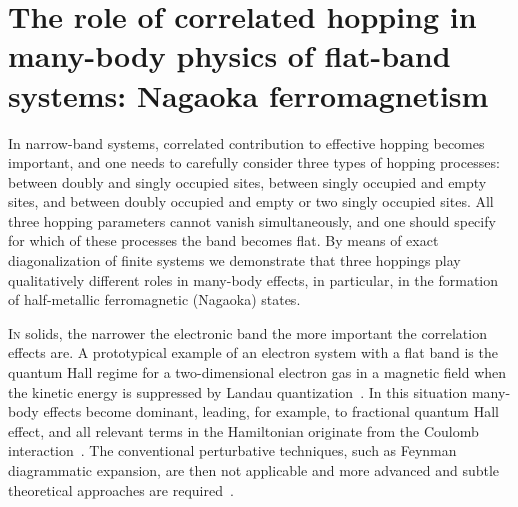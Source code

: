 \cleartoverso
\thispagestyle{empty}%
\BgThisPage
\clearpage
\chapter[The role of correlated hopping in many-body physics of flat-band systems: Nagaoka ferromagnetism][Correlated hoppings in many-body physics of flat-band systems]{The role of correlated hopping in many-body physics of flat-band systems: Nagaoka ferromagnetism}\label{ch:corr-hops}
\BgThisPage

{\small In narrow-band systems, correlated contribution to effective hopping becomes important, and one needs to carefully consider three types of hopping processes: between doubly and singly occupied sites, between singly occupied and empty sites, and between doubly occupied and empty or two singly occupied sites. All three hopping parameters cannot vanish simultaneously, and one should specify for which of these processes the band becomes flat. By means of exact diagonalization of finite systems we demonstrate that three hoppings play qualitatively different roles in many-body effects, in particular, in the formation of half-metallic ferromagnetic (Nagaoka) states.}

\clearpage


\lettrine[lines=3]{I}{n} solids, the narrower the electronic band the more important the correlation effects are. A prototypical example of an electron system with a flat band is the quantum Hall regime for a two-dimensional electron gas in a magnetic field when the kinetic energy is suppressed by Landau quantization~\cite{quant_hall}. In this situation many-body effects become dominant, leading, for example, to fractional quantum Hall effect, and all relevant terms in the Hamiltonian originate from the Coulomb interaction~\cite{murthy}. The conventional perturbative techniques, such as Feynman diagrammatic expansion, are then not applicable and more advanced and subtle theoretical approaches are required~\cite{hansson}. 


